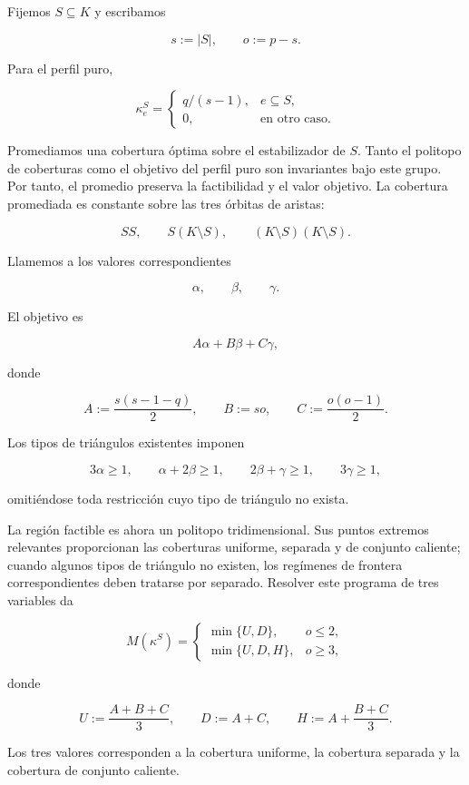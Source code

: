 \documentclass[spanish,11pt,a4paper]{article}
\begin{document}
Fijemos \(S\subseteq K\) y escribamos

\[
s:=|S|,
\qquad
o:=p-s.
\]

Para el perfil puro,

\[
\kappa_e^S
=
\begin{cases}
q/(s-1),&e\subseteq S,\\
0,&\text{en otro caso}.
\end{cases}
\tag{6.1}
\]

Promediamos una cobertura óptima sobre el estabilizador de \(S\). Tanto
el politopo de coberturas como el objetivo del perfil puro son
invariantes bajo este grupo. Por tanto, el promedio preserva la
factibilidad y el valor objetivo. La cobertura promediada es constante
sobre las tres órbitas de aristas:

\[
SS,\qquad
S(K\setminus S),\qquad
(K\setminus S)(K\setminus S).
\]

Llamemos a los valores correspondientes

\[
\alpha,\qquad\beta,\qquad\gamma.
\]

El objetivo es

\[
A\alpha+B\beta+C\gamma,
\tag{6.2}
\]

donde

\[
A:=\frac{s(s-1-q)}2,
\qquad
B:=so,
\qquad
C:=\frac{o(o-1)}2.
\tag{6.3}
\]

Los tipos de triángulos existentes imponen

\[
3\alpha\ge1,
\qquad
\alpha+2\beta\ge1,
\qquad
2\beta+\gamma\ge1,
\qquad
3\gamma\ge1,
\tag{6.4}
\]

omitiéndose toda restricción cuyo tipo de triángulo no exista.

La región factible es ahora un politopo tridimensional. Sus puntos
extremos relevantes proporcionan las coberturas uniforme, separada y de
conjunto caliente; cuando algunos tipos de triángulo no existen, los
regímenes de frontera correspondientes deben tratarse por separado.
Resolver este programa de tres variables da

\[
M(\kappa^S)
=
\begin{cases}
\min\{U,D\},&o\le2,\\[1mm]
\min\{U,D,H\},&o\ge3,
\end{cases}
\tag{6.5}
\]

donde

\[
U:=\frac{A+B+C}{3},
\qquad
D:=A+C,
\qquad
H:=A+\frac{B+C}{3}.
\tag{6.6}
\]

Los tres valores corresponden a la cobertura uniforme, la cobertura
separada y la cobertura de conjunto caliente.
\end{document}
